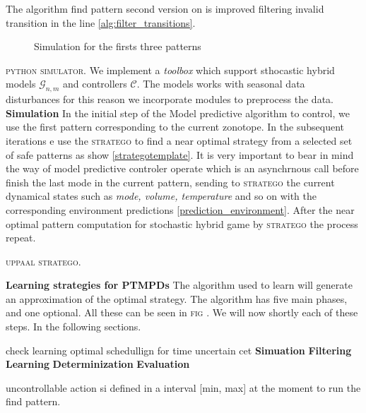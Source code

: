     The algorithm find pattern second version on \cite{le2017improved} 
    is improved filtering invalid transition in the line \ref{alg:filter_transitions}.     
    \begin{figure}[!hbt]
      \begin{center}
          
          \caption{Simulation for the firsts three patterns}
      \end{center}
    \end{figure}
    
    
    \textsc{python simulator}. We implement a \emph{toolbox} which support
    sthocastic hybrid models $\mathcal{G}_{n,m}$ and controllers $\mathcal{C}$. The models works with seasonal data 
    disturbances for this reason we incorporate modules to preprocess the data.
    \textbf{Simulation} In the initial step of the Model predictive algorithm to control,
    we use the first pattern corresponding to the current zonotope. In the subsequent 
    iterations e use the \textsc{stratego} to find a near optimal strategy from a selected
    set of safe patterns as show \ref{strategotemplate}. It is very important to bear in mind 
    the way of model predictive controler operate which is an asynchrnous call 
    before finish the last mode in the current pattern, sending to \textsc{stratego}
    the current dynamical states such as \emph{mode, volume, temperature} and so on with the
    corresponding environment predictions \ref{prediction_environment}.
    After the near optimal pattern computation for stochastic hybrid game 
    by \textsc{stratego} the process repeat.

    \textsc{uppaal stratego}. 

    \textbf{Learning strategies for PTMPDs}
    The algorithm used to learn will generate an approximation of the optimal strategy.
    The algorithm has five main phases, and one optional. All these can be seen 
    in \textsc{fig} . We will now shortly each of these steps. In the following 
    sections. 

    check learning optimal schedullign for time uncertain cet
    \textbf{Simuation}
    \textbf{Filtering}
    \textbf{Learning}
    \textbf{Determinization}
    \textbf{Evaluation}

    uncontrollable action si defined in a interval [min, max] at the moment to run 
    the find pattern. 

